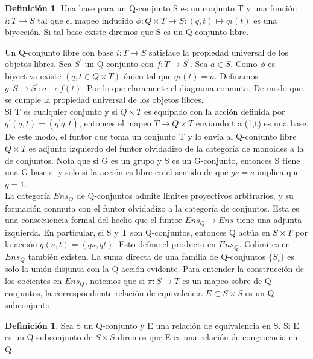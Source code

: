 \documentclass[12pt,spanish]{amsart}
\theoremstyle{definition}
\newtheorem{Def}[Theorem]{Definición}
\theoremstyle{remark}
\begin{document}
\begin{Def}
Una base para un Q-conjunto S es un conjunto T y una función $i:T \to S$ tal que el mapeo inducido $\phi:Q\times T \to S:(q,t)\mapsto qi(t)$ es una biyección. Si tal base existe diremos que S es un Q-conjunto libre.
\end{Def}

Un Q-conjunto libre con base $i:T\to S$ satisface la propiedad universal de los objetos libres. Sea $S^{\prime}$ un Q-conjunto con $f:T \to S^{\prime}$. Sea $a\in S$. Como $\phi$ es biyectiva existe $(q,t\in Q\times T)$ único tal que $qi(t)=a$. Definamos $g:S \to S^{\prime}:a \to f(t)$. Por lo que claramente el diagrama conmuta. De modo que se cumple la propiedad universal de los objetos libres. \\

Si T es cualquier conjunto y si $Q\times T$ es equipado con la acción definida por $q^{\prime}(q,t)=(q^{\prime}q,t)$, entonces el mapeo $T \to Q\times T$ enviando t a (1,t) es una base. De este modo, el funtor que toma un conjunto T y lo envía al Q-conjunto libre $Q\times T$ es adjunto izquierdo del funtor olvidadizo de la categoría de monoides a la de conjuntos. Nota que si G es un grupo y S es un G-conjunto, entonces S tiene una G-base si y solo si la acción es libre en el sentido de que $gs=s$ implica que $g=1$. \\

La categoría $Ens_{Q}$ de Q-conjuntos admite límites proyectivos arbitrarios, y su formación conmuta con el funtor olvidadizo a la categoría de conjuntos. Esta es una consecuencia formal del hecho que el funtor $Ens_{Q}\to Ens $ tiene una adjunta izquierda. En particular, si S y T son Q-conjuntos, entonces Q actúa en $S\times T$ por la acción $q(s,t)=(qs,qt)$. Esto define el producto en $Ens_{Q}.$ 
Colímites en $Ens_{Q}$ también existen. La suma directa de una familia de Q-conjuntos $\{S_{i}\}$ es solo la unión disjunta con la Q-acción evidente. Para entender la construcción de los cocientes en $Ens_{Q}$, notemos que si $\pi: S \to T$ es un mapeo sobre de Q-conjuntos, la correspondiente relación de equivalencia $E\subset S \times S$ es un Q-subconjunto. 

\begin{Def}
Sea S un Q-conjunto y E una relación de equivalencia en S. Si E es un Q-subconjunto de $S\times S$ diremos que E es una relación de congruencia en Q. 
\end{Def}
\end{document}
